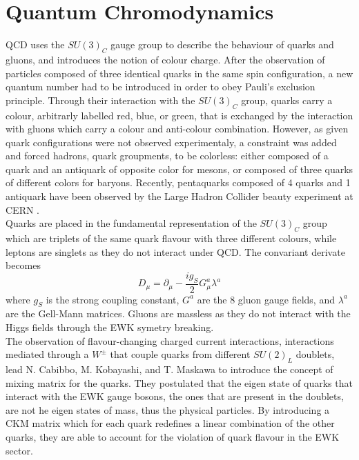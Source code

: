  \section{Quantum Chromodynamics}

    QCD uses the $ SU(3)_C $ gauge group to describe the behaviour of quarks and gluons, and introduces the notion of colour charge. After the observation of particles composed of three identical quarks in the same spin configuration, a new quantum number had to be introduced in order to obey Pauli's exclusion principle. Through their interaction with the $ SU(3)_C $ group, quarks carry a colour, arbitrarly labelled red, blue, or green, that is exchanged by the interaction with gluons which carry a colour and anti-colour combination. However, as given quark configurations were not observed experimentaly, a constraint was added and forced hadrons, quark groupments, to be colorless: either composed of a quark and an antiquark of opposite color for mesons, or composed of three quarks of different colors for baryons. Recently, pentaquarks composed of 4 quarks and 1 antiquark have been observed by the Large Hadron Collider beauty experiment at CERN \cite{Aaij:2015tga}. \\

    Quarks are placed in the fundamental representation of the $ SU(3)_C $ group which are triplets of the same quark flavour with three different colours, while leptons are singlets as they do not interact under QCD. The convariant derivate becomes
    \begin{equation}
      D_\mu = \partial_\mu - \frac{i g_S}{2} G^a_\mu \lambda^a
    \end{equation}
    where $ g_S $ is the strong coupling constant, $ G^a $ are the 8 gluon gauge fields, and $ \lambda^a $ are the Gell-Mann matrices. Gluons are massless as they do not interact with the Higgs fields through the EWK symetry breaking. \\

    The observation of flavour-changing charged current interactions, interactions mediated through a $ W^\pm $ that couple quarks from different $ SU(2)_L $ doublets, lead N. Cabibbo, M. Kobayashi, and T. Maskawa to introduce the concept of mixing matrix for the quarks. They postulated that the eigen state of quarks that interact with the EWK gauge bosons, the ones that are present in the doublets, are not he eigen states of mass, thus the physical particles. By introducing a CKM matrix which for each quark redefines a linear combination of the other quarks, they are able to account for the violation of quark flavour in the EWK sector.

